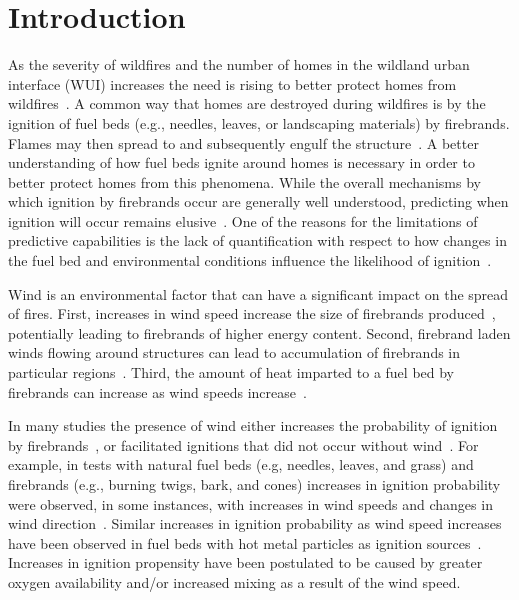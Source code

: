 \section{Introduction} 

    As the severity of wildfires and the number of homes in the wildland urban interface (WUI) increases the need is rising to better protect homes from wildfires~\cite{Marlon2012Long-termUSA, Manzello2013, Barrett2020}. A common way that homes are destroyed during wildfires is by the ignition of fuel beds (e.g., needles, leaves, or landscaping materials) by firebrands. Flames may then spread to and subsequently engulf the structure~\cite{Manzello2014, Maranghides2013NISTIgnitions}. A better understanding of how fuel beds ignite around homes is necessary in order to better protect homes from this phenomena. While the overall mechanisms by which ignition by firebrands occur are generally well understood, predicting when ignition will occur remains elusive~\cite{Fernandez-Pello2017}. One of the reasons for the limitations of predictive capabilities is the lack of quantification with respect to how changes in the fuel bed and environmental conditions influence the likelihood of ignition~\cite{Finney2013}.
    
    Wind is an environmental factor that can have a significant impact on the spread of fires. First, increases in wind speed increase the size of firebrands produced~\cite{Suzuki2013}, potentially leading to firebrands of higher energy content. Second, firebrand laden winds flowing around structures can lead to accumulation of firebrands in particular regions~\cite{Suzuki2020a, Manzello2014}. Third, the amount of heat imparted to a fuel bed by firebrands can increase as wind speeds increase~\cite{Hakes2019a, Tao2020, Salehizadeh2021}. 
    
    In many studies the presence of wind either increases the probability of ignition by firebrands~\cite{Filkov2016, Manzello2006, Manzello2006a, Matvienko2018, Ellis2015, Plucinski2008}, or facilitated ignitions that did not occur without wind~\cite{Ellis2011}. For example, in tests with natural fuel beds (e.g, needles, leaves, and grass) and firebrands (e.g., burning twigs, bark, and cones) increases in ignition probability were observed, in some instances, with increases in wind speeds and changes in wind direction~\cite{Ganteaume2009}. Similar increases in ignition probability as wind speed increases have been observed in fuel beds with hot metal particles as ignition sources~\cite{Wang2017}. Increases in ignition propensity have been postulated to be caused by greater oxygen availability and/or increased mixing as a result of the wind speed. 
    
